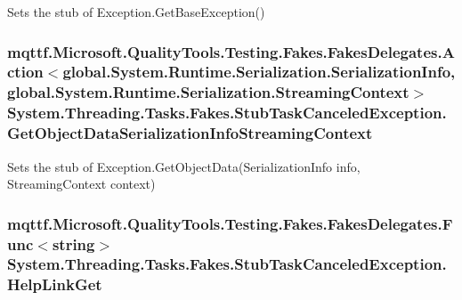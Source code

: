 Sets the stub of Exception.\-Get\-Base\-Exception()

\hypertarget{class_system_1_1_threading_1_1_tasks_1_1_fakes_1_1_stub_task_canceled_exception_a193dcc9e9d070f4ef3c54dd5def762ed}{
\subsubsection[{Get\-Object\-Data\-Serialization\-Info\-Streaming\-Context}]{\setlength{\rightskip}{0pt plus 5cm}mqttf.\-Microsoft.\-Quality\-Tools.\-Testing.\-Fakes.\-Fakes\-Delegates.\-Action$<$global.\-System.\-Runtime.\-Serialization.\-Serialization\-Info, global.\-System.\-Runtime.\-Serialization.\-Streaming\-Context$>$ System.\-Threading.\-Tasks.\-Fakes.\-Stub\-Task\-Canceled\-Exception.\-Get\-Object\-Data\-Serialization\-Info\-Streaming\-Context}}\label{class_system_1_1_threading_1_1_tasks_1_1_fakes_1_1_stub_task_canceled_exception_a193dcc9e9d070f4ef3c54dd5def762ed}


Sets the stub of Exception.\-Get\-Object\-Data(\-Serialization\-Info info, Streaming\-Context context)

\hypertarget{class_system_1_1_threading_1_1_tasks_1_1_fakes_1_1_stub_task_canceled_exception_a16db753e00c8d237c044fcaacaaca971}{
\subsubsection[{Help\-Link\-Get}]{\setlength{\rightskip}{0pt plus 5cm}mqttf.\-Microsoft.\-Quality\-Tools.\-Testing.\-Fakes.\-Fakes\-Delegates.\-Func$<$string$>$ System.\-Threading.\-Tasks.\-Fakes.\-Stub\-Task\-Canceled\-Exception.\-Help\-Link\-Get}}\label{class_system_1_1_threading_1_1_tasks_1_1_fakes_1_1_stub_task_canceled_exception_a16db753e00c8d237c044fcaacaaca971}


